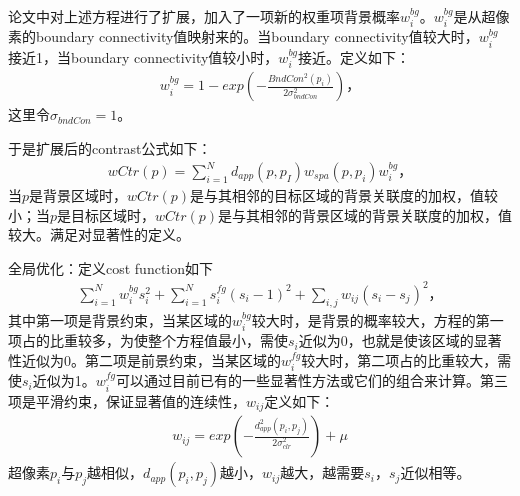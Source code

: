 \documentclass[12pt]{article}
\begin{document}
论文中对上述方程进行了扩展，加入了一项新的权重项背景概率$w_i^{bg}$。$w_i^{bg}$是从超像素的boundary connectivity值映射来的。当boundary connectivity值较大时，$w_i^{bg}$接近1，当boundary connectivity值较小时，$w_i^{bg}$接近。定义如下：
\begin{align}
w_i^{bg} = 1-exp(-\frac{BndCon^2(p_i)}{2\sigma_{bndCon}^2})，
\end{align}
这里令$\sigma_{bndCon}=1$。

于是扩展后的contrast公式如下：
\begin{align}
wCtr(p) = \sum_{i=1}^{N}d_{app}(p, p_I)w_{spa}(p, p_i)w_i^{bg}，
\end{align}
当$p$是背景区域时，$wCtr(p)$是与其相邻的目标区域的背景关联度的加权，值较小；当$p$是目标区域时，$wCtr(p)$是与其相邻的背景区域的背景关联度的加权，值较大。满足对显著性的定义。

全局优化：定义cost function如下
\begin{align}
\sum_{i=1}^{N}w_i^{bg}s_i^2+\sum_{i=1}^{N}s_i^{fg}(s_i-1)^2+\sum_{i, j}w_{ij}(s_i-s_j)^2，
\end{align}
其中第一项是背景约束，当某区域的$w_i^{bg}$较大时，是背景的概率较大，方程的第一项占的比重较多，为使整个方程值最小，需使$s_i$近似为0，也就是使该区域的显著性近似为0。第二项是前景约束，当某区域的$w_i^{fg}$较大时，第二项占的比重较大，需使$s_i$近似为1。$w_i^{fg}$可以通过目前已有的一些显著性方法或它们的组合来计算。第三项是平滑约束，保证显著值的连续性，$w_{ij}$定义如下：
\begin{align}
w_{ij} = exp(-\frac{d_{app}^2(p_i, p_j)}{2\sigma_{clr}^2})+\mu
\end{align}
超像素$p_i$与$p_j$越相似，$d_{app}(p_i, p_j)$越小，$w_{ij} $越大，越需要$s_i$，$s_j$近似相等。


%


\end{document}
